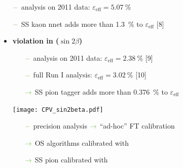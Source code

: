 {\begin{minipage}{0.474\boxwidth}
\begin{itemize}
	\begin{itemize}
	\setlength\itemsep{0.01em}
	\setlength{\itemindent}{-.11in}
	\item[${\color{tu_gruen}-}$] analysis on \num{2011} data: $\varepsilon_\text{eff}=\SI{5.07}{\%}$
	\item[${\color{tu_gruen}-}$] SS kaon nnet adds more than \SI{1.3}{\%} to $\varepsilon_\text{eff}$ [8]
	\end{itemize}
\end{itemize}
\end{minipage}
\vspace{0.7em}
\hfill
\begin{minipage}{0.474\boxwidth}
\vspace{-0.2em}
\begin{itemize}
\item\textbf{\CP violation in \BdToJPsiKS ($\sin2\beta$)}
	\begin{itemize}
	\setlength\itemsep{0.01em}
	\setlength{\itemindent}{-.11in}
	\item[${\color{tu_gruen}-}$] analysis on \num{2011} data: $\varepsilon_\text{eff}=\SI{2.38}{\%}$ [9]
	\item[${\color{tu_gruen}-}$] full Run I analysis: $\varepsilon_\text{eff}=\SI{3.02}{\%}$ [10] 
	\setlength{\itemindent}{.05in} 
	\item[${\color{tu_gruen}\rightarrow}$] SS pion tagger adds more than \SI{0.376}{\%} to $\varepsilon_\text{eff}$ 
	\end{itemize}
	
\vspace{-1.7em}
\begin{center}
\texttt{[image: CPV\_sin2beta.pdf]}
\end{center}
\vspace{-2.5em}

	\begin{itemize}
	\setlength{\itemindent}{-.11in}
	\setlength\itemsep{0.01em}
	\item[${\color{tu_gruen}-}$] precision analysis \hspace{0.1em}${\color{tu_gruen}\rightarrow}$ ``ad-hoc'' FT calibration
	\setlength{\itemindent}{.05in}
	\item[${\color{tu_gruen}\rightarrow}$] OS algorithms calibrated with \BuToJPsiKp 
	\item[${\color{tu_gruen}\rightarrow}$] SS pion calibrated with \BdToJPsiKst
	\end{itemize}


\end{itemize}
\end{minipage}}
